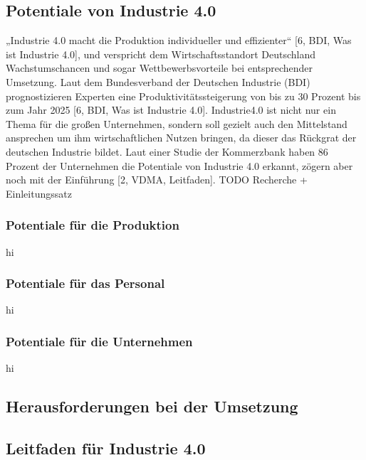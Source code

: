\subsection{Potentiale von Industrie 4.0}\label{sec:PotentialeIndustrie4.0}

„Industrie 4.0 macht die Produktion individueller und effizienter“ [6, BDI, Was ist Industrie 4.0], und verspricht dem Wirtschaftsstandort Deutschland Wachstumschancen und sogar Wettbewerbsvorteile bei entsprechender Umsetzung. Laut dem Bundesverband der Deutschen Industrie (BDI) prognostizieren Experten eine Produktivitätssteigerung von bis zu 30 Prozent bis zum Jahr 2025 [6, BDI, Was ist Industrie 4.0].
Industrie4.0 ist nicht nur ein Thema für die großen Unternehmen, sondern soll gezielt auch den Mittelstand ansprechen um ihm wirtschaftlichen Nutzen bringen, da dieser das Rückgrat der deutschen Industrie bildet. Laut einer Studie der Kommerzbank haben 86 Prozent der Unternehmen die Potentiale von Industrie 4.0 erkannt, zögern aber noch mit der Einführung [2, VDMA, Leitfaden].
\newline\newline
TODO Recherche + Einleitungssatz

\subsubsection{Potentiale für die Produktion}\label{sec:PotentialeUnternehmen}
hi
\subsubsection{Potentiale für das Personal}\label{sec:PotentialPersonal}
hi
\subsubsection{Potentiale für die Unternehmen}\label{sec:PotentialKunden}
hi

\subsection{Herausforderungen bei der Umsetzung}\label{sec:HerausforderungenUmsetzung}

\lipsum[2]

\subsection{Leitfaden für Industrie 4.0}\label{sec:LeitfadenUmsetung}

